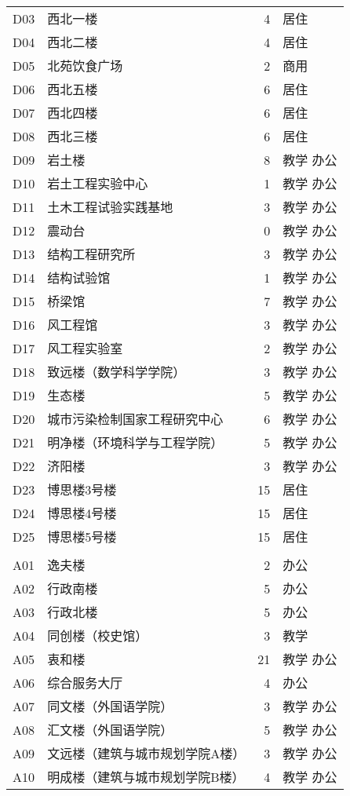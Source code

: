 \begin{center}
\begin{longtable}{|l|l|r|l|}
D03 & 西北一楼 & 4  & 居住 \\
D04 & 西北二楼 & 4  & 居住 \\
D05 & 北苑饮食广场 & 2  & 商用  \\
D06 & 西北五楼 & 6  & 居住 \\
D07 & 西北四楼 & 6  & 居住 \\
D08 & 西北三楼 & 6  & 居住 \\
D09 & 岩土楼 & 8  & 教学 办公 \\
D10 & 岩土工程实验中心 & 1  & 教学 办公 \\
D11 & 土木工程试验实践基地 & 3  & 教学 办公 \\
D12 & 震动台 & 0  & 教学 办公 \\
D13 & 结构工程研究所 & 3  & 教学 办公 \\
D14 & 结构试验馆 & 1  & 教学 办公 \\
D15 & 桥梁馆 & 7  & 教学 办公 \\
D16 & 风工程馆 & 3  & 教学 办公 \\
D17 & 风工程实验室 & 2  & 教学 办公 \\
D18 & 致远楼（数学科学学院） & 3  & 教学 办公 \\
D19 & 生态楼 & 5  & 教学 办公 \\
D20 & 城市污染检制国家工程研究中心 & 6  & 教学 办公 \\
D21 & 明净楼（环境科学与工程学院） & 5  & 教学 办公 \\
D22 & 济阳楼 & 3  & 教学 办公 \\
D23 & 博思楼3号楼 & 15 & 居住 \\
D24 & 博思楼4号楼 & 15 & 居住 \\
D25 & 博思楼5号楼 & 15 & 居住 \\
    &    &    &  \\
A01 & 逸夫楼 & 2  & 办公 \\
A02 & 行政南楼 & 5  & 办公 \\
A03 & 行政北楼 & 5  & 办公 \\
A04 & 同创楼（校史馆） & 3  & 教学 \\
A05 & 衷和楼 & 21 & 教学 办公 \\
A06 & 综合服务大厅 & 4  & 办公 \\
A07 & 同文楼（外国语学院） & 3  & 教学 办公 \\
A08 & 汇文楼（外国语学院） & 5  & 教学 办公 \\
A09 & 文远楼（建筑与城市规划学院A楼） & 3  & 教学 办公 \\
A10 & 明成楼（建筑与城市规划学院B楼） & 4  & 教学 办公 \\

\end{longtable}
\end{center}
